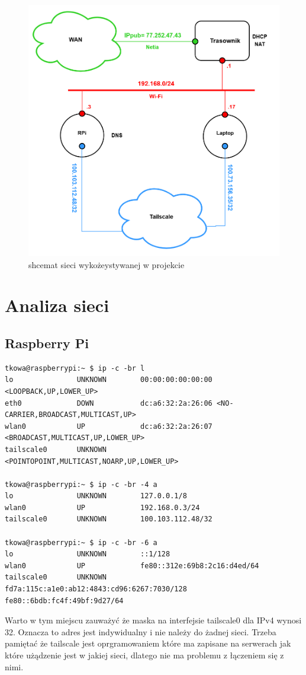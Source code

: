 \documentclass{article}
\begin{document}
\begin{figure}[H]
    \centering
    \includegraphics[scale=0.5]{siec3.png}
    \caption{shcemat sieci wykożeystywanej w projekcie}
  \label{fig:siec}
\end{figure}

\section{Analiza sieci}
\subsection*{Raspberry Pi}
\begin{lstlisting}
tkowa@raspberrypi:~ $ ip -c -br l
lo               UNKNOWN        00:00:00:00:00:00 <LOOPBACK,UP,LOWER_UP>
eth0             DOWN           dc:a6:32:2a:26:06 <NO-CARRIER,BROADCAST,MULTICAST,UP>
wlan0            UP             dc:a6:32:2a:26:07 <BROADCAST,MULTICAST,UP,LOWER_UP>
tailscale0       UNKNOWN        <POINTOPOINT,MULTICAST,NOARP,UP,LOWER_UP>

tkowa@raspberrypi:~ $ ip -c -br -4 a
lo               UNKNOWN        127.0.0.1/8
wlan0            UP             192.168.0.3/24
tailscale0       UNKNOWN        100.103.112.48/32

tkowa@raspberrypi:~ $ ip -c -br -6 a
lo               UNKNOWN        ::1/128
wlan0            UP             fe80::312e:69b8:2c16:d4ed/64
tailscale0       UNKNOWN        fd7a:115c:a1e0:ab12:4843:cd96:6267:7030/128
fe80::6bdb:fc4f:49bf:9d27/64
\end{lstlisting}
Warto w tym miejscu zauważyć że maska na interfejsie tailscale0 dla IPv4 wynosi 32. Oznacza to adres jest indywidualny i nie należy do żadnej sieci. Trzeba pamiętać że tailscale jest oprgramowaniem które ma zapisane na serwerach jak które użądzenie jest w jakiej sieci, dlatego nie ma problemu z łączeniem się z nimi.
\end{document}
